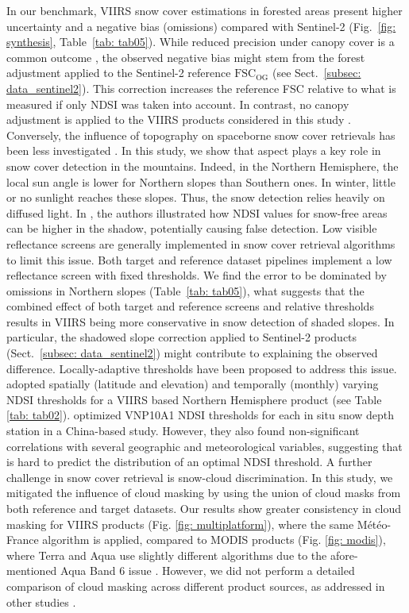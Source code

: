 \documentclass[tc, manuscript]{copernicus}
\begin{document}
In our benchmark, VIIRS snow cover estimations in forested areas present higher uncertainty and a negative bias (omissions) compared with Sentinel-2 (Fig.~\ref{fig: synthesis}, Table~\ref{tab: tab05}). While reduced precision under canopy cover is a common outcome \citep{stillinger_landsat_2023, muhuri_performance_2021, rittger2020CanopyAdjustmentImproved}, the observed negative bias might stem from the forest adjustment applied to the Sentinel-2 reference $\mathrm{FSC_{OG}}$ (see Sect.~\ref{subsec: data_sentinel2}). This correction increases the reference FSC relative to what is measured if only NDSI was taken into account. In contrast, no canopy adjustment is applied to the VIIRS products considered in this study \citep{rittger2020CanopyAdjustmentImproved}. Conversely, the influence of topography on spaceborne snow cover retrievals has been less investigated \citep{rittger_evaluation_2021}. In this study, we show that aspect plays a key role in snow cover detection in the mountains. Indeed, in the Northern Hemisphere, the local sun angle is lower for Northern slopes than Southern ones. In winter, little or no sunlight reaches these slopes. Thus, the snow detection relies heavily on diffused light. In \citep{keuris_adaptive_2023}, the authors illustrated how NDSI values for snow-free areas can be higher in the shadow, potentially causing false detection. Low visible reflectance screens are generally implemented in snow cover retrieval algorithms to limit this issue. Both target and reference dataset pipelines implement a low reflectance screen with fixed thresholds. We find the error to be dominated by omissions in Northern slopes (Table~\ref{tab: tab05}), what suggests that the combined effect of both target and reference screens and relative thresholds results in VIIRS being more conservative in snow detection of shaded slopes. In particular, the shadowed slope correction applied to Sentinel-2 products (Sect.~\ref{subsec: data_sentinel2}) might contribute to explaining the observed difference. Locally-adaptive thresholds have been proposed to address this issue.  \cite{schwaizer2020SnowCoverExtent} adopted spatially (latitude and elevation) and temporally (monthly) varying NDSI thresholds for a VIIRS based Northern Hemisphere product (see Table \ref{tab: tab02}). \cite{zhang_comparative_2020} optimized VNP10A1 NDSI thresholds for each in situ snow depth station in a China-based study. However, they also found non-significant correlations with several geographic and meteorological variables, suggesting that is hard to predict the distribution of an optimal NDSI threshold. A further challenge in snow cover retrieval is snow-cloud discrimination. In this study, we mitigated the influence of cloud masking by using the union of cloud masks from both reference and target datasets. Our results show greater consistency in cloud masking for VIIRS products (Fig. \ref{fig: multiplatform}), where the same Météo-France algorithm is applied, compared to MODIS products (Fig. \ref{fig: modis}), where Terra and Aqua use slightly different algorithms due to the afore-mentioned Aqua Band 6 issue \citep{riggs2021MODISAquaSnow}. However, we did not perform a detailed comparison of cloud masking across different product sources, as addressed in other studies \citep{liu2022EffectCloudMask}.
\end{document}
